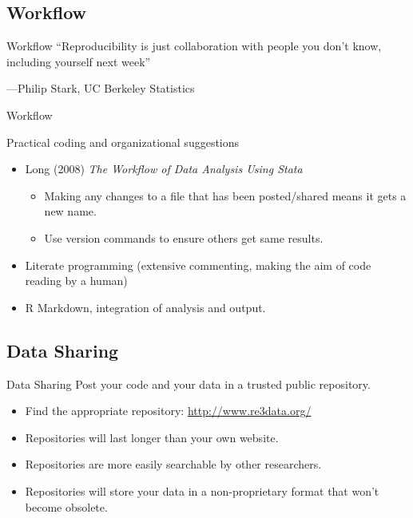 \documentclass{beamer}
\begin{document}
 \subsection*{Workflow}
 \begin{frame}{Workflow}
``Reproducibility is just collaboration with people you don't know,
including yourself next week''

---Philip Stark, UC Berkeley Statistics
\end{frame}
\begin{frame}{Workflow}

 Practical coding and organizational suggestions
 \begin{itemize}
 \item Long (2008) \textit{The Workflow of Data Analysis Using Stata}
 \begin{itemize}
 	\item Making any changes to a file that has been posted/shared means it gets a new name.
 	\item Use version commands to ensure others get same results.
  \end{itemize}
 \item Literate programming (extensive commenting, making the aim of code reading by a human)
 \item R Markdown, integration of analysis and output.
\end{itemize}
\end{frame}

\subsection*{Data Sharing}
\begin{frame}{Data Sharing}
Post your code and your data in a trusted public repository.
\begin{itemize}[<.->]
\item
Find the appropriate repository: \url{http://www.re3data.org/}
\item
Repositories will last longer than your own website.
\item
Repositories are more easily searchable by other researchers.
\item
Repositories will store your data in a non-proprietary format that won't become obsolete.
\end{itemize}
\end{frame}
\end{document}
